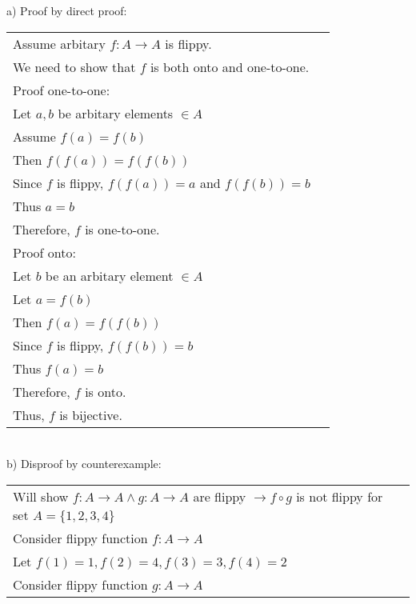 \documentclass[12pt]{exam}
\begin{document}
\begin{solution}
	a) Proof by direct proof:\\
	\begin{tabular}{ll}
		Assume arbitary $f\colon A\to A$ is flippy.           \\
		We need to show that $f$ is both onto and one-to-one. \\
		Proof one-to-one:                                     \\
		Let $a,b$ be arbitary elements $\in A$                \\
		Assume $f(a) = f(b)$                                  \\
		Then $f(f(a)) = f(f(b))$                              \\
		Since $f$ is flippy, $f(f(a)) = a$ and $f(f(b)) = b$  \\
		Thus $a = b$                                          \\
		Therefore, $f$ is one-to-one.                         \\
		Proof onto:                                           \\
		Let $b$ be an arbitary element $\in A$                \\
		Let $a = f(b)$                                        \\
		Then $f(a) = f(f(b))$                                 \\
		Since $f$ is flippy, $f(f(b)) = b$                    \\
		Thus $f(a) = b$                                       \\
		Therefore, $f$ is onto.                               \\
		Thus, $f$ is bijective.                               \\
	\end{tabular}
	\\b) Disproof by counterexample:\\
	\begin{tabular}{ll}
		Will show $f: A\to A \land g: A\to A$ are flippy $\rightarrow f\circ g$ is not flippy for set $A = \{1,2,3,4\}$ \\
		Consider flippy function $f: A\to A$                                                                            \\
		Let $f(1) = 1, f(2) = 4, f(3) = 3, f(4) = 2$                                                                    \\
		Consider flippy function $g: A\to A$                                                                            \\

\end{tabular}
\end{solution}
\end{document}
